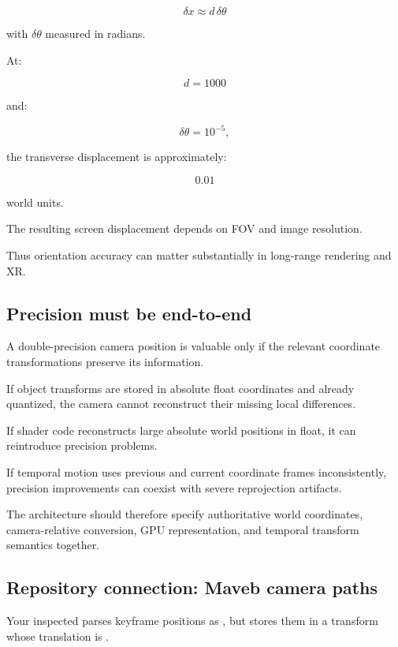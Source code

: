 \[
 \boxed{ \delta x\approx d\,\delta\theta }
\]

with \(\delta\theta\) measured in radians.

At:

\[
 d=1000
\]

and:

\[
 \delta\theta=10^{-5},
\]

the transverse displacement is approximately:

\[
 0.01
\]

world units.

The resulting screen displacement depends on FOV and image resolution.

Thus orientation accuracy can matter substantially in long-range rendering and XR.

\subsection{Precision must be end-to-end}\label{02-foundations-ii-ch036-precision-must-be-end-to-end}

\hypertarget{02-foundations-ii-ch036-precision-must-be-end-to-end}{}

A double-precision camera position is valuable only if the relevant coordinate transformations preserve its information.

If object transforms are stored in absolute float coordinates and already quantized, the camera cannot reconstruct their missing local differences.

If shader code reconstructs large absolute world positions in float, it can reintroduce precision problems.

If temporal motion uses previous and current coordinate frames inconsistently, precision improvements can coexist with severe reprojection artifacts.

The architecture should therefore specify authoritative world coordinates, camera-relative conversion, GPU representation, and temporal transform semantics together.

\subsection{Repository connection: Maveb camera paths}\label{02-foundations-ii-ch036-repository-connection-maveb-camera-paths}

\hypertarget{02-foundations-ii-ch036-repository-connection-maveb-camera-paths}{}

Your inspected  parses keyframe positions as , but stores them in a transform whose translation is .

